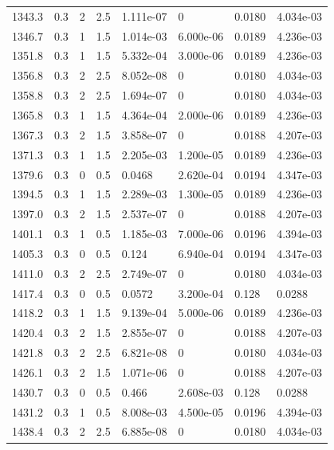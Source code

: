 \documentclass[preview]{standalone}
\begin{document}
{{{{\begin{tabular}{L{1.2cm}C{1.2cm} C{0.3cm}C{0.5cm} C{1.4cm}C{1.4cm} C{1.4cm}C{1.4cm}}
  1343.3  &   0.3  & 2     & 2.5 &  1.111e-07  & 0  & 0.0180 &  4.034e-03   \\ 
  1346.7  &   0.3  & 1     & 1.5 &  1.014e-03  & 6.000e-06  & 0.0189 &  4.236e-03   \\ 
  1351.8  &   0.3  & 1     & 1.5 &  5.332e-04  & 3.000e-06  & 0.0189 &  4.236e-03   \\ 
  1356.8  &   0.3  & 2     & 2.5 &  8.052e-08  & 0  & 0.0180 &  4.034e-03   \\ 
  1358.8  &   0.3  & 2     & 2.5 &  1.694e-07  & 0  & 0.0180 &  4.034e-03   \\ 
  1365.8  &   0.3  & 1     & 1.5 &  4.364e-04  & 2.000e-06  & 0.0189 &  4.236e-03   \\ 
  1367.3  &   0.3  & 2     & 1.5 &  3.858e-07  & 0  & 0.0188 &  4.207e-03   \\ 
  1371.3  &   0.3  & 1     & 1.5 &  2.205e-03  & 1.200e-05  & 0.0189 &  4.236e-03   \\ 
  1379.6  &   0.3  & 0     & 0.5 &  0.0468  & 2.620e-04  & 0.0194 &  4.347e-03   \\ 
  1394.5  &   0.3  & 1     & 1.5 &  2.289e-03  & 1.300e-05  & 0.0189 &  4.236e-03   \\ 
  1397.0  &   0.3  & 2     & 1.5 &  2.537e-07  & 0  & 0.0188 &  4.207e-03   \\ 
  1401.1  &   0.3  & 1     & 0.5 &  1.185e-03  & 7.000e-06  & 0.0196 &  4.394e-03   \\ 
  1405.3  &   0.3  & 0     & 0.5 &  0.124  & 6.940e-04  & 0.0194 &  4.347e-03   \\ 
  1411.0  &   0.3  & 2     & 2.5 &  2.749e-07  & 0  & 0.0180 &  4.034e-03   \\ 
  1417.4  &   0.3  & 0     & 0.5 &  0.0572  & 3.200e-04  & 0.128 &  0.0288   \\ 
  1418.2  &   0.3  & 1     & 1.5 &  9.139e-04  & 5.000e-06  & 0.0189 &  4.236e-03   \\ 
  1420.4  &   0.3  & 2     & 1.5 &  2.855e-07  & 0  & 0.0188 &  4.207e-03   \\ 
  1421.8  &   0.3  & 2     & 2.5 &  6.821e-08  & 0  & 0.0180 &  4.034e-03   \\ 
  1426.1  &   0.3  & 2     & 1.5 &  1.071e-06  & 0  & 0.0188 &  4.207e-03   \\ 
  1430.7  &   0.3  & 0     & 0.5 &  0.466  & 2.608e-03  & 0.128 &  0.0288   \\ 
  1431.2  &   0.3  & 1     & 0.5 &  8.008e-03  & 4.500e-05  & 0.0196 &  4.394e-03   \\ 
  1438.4  &   0.3  & 2     & 2.5 &  6.885e-08  & 0  & 0.0180 &  4.034e-03   \\ 

\end{tabular}}}}}
\end{document}

